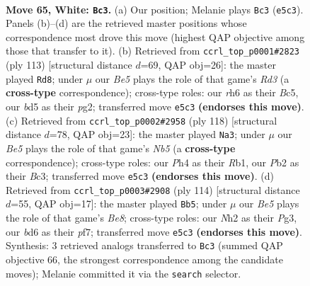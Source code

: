 \documentclass[11pt]{article}
\begin{document}
\clearpage

\begin{figure}[p]\centering
\begin{subfigure}{0.46\textwidth}\centering
\resizebox{\linewidth}{!}{%
\newchessgame
\chessboard[
  setfen={4r3/5kp1/p2b3r/PppbBp1p/2p2P1P/4P1P1/1P2K2N/1R4R1 w - - 2 65},
  showmover=false,
  pgfstyle=straightmove, color=movearrow, markmove={e5-c3}
]}
\caption{}
\end{subfigure}\hfill
\begin{subfigure}{0.46\textwidth}\centering
\resizebox{\linewidth}{!}{%
\newchessgame
\chessboard[
  setfen={8/2p2pk1/1p1r1p1p/pPbBp3/P3P2P/2P2R2/4KPP1/8 b - - 4 57},
  showmover=false,
  pgfstyle=straightmove, color=movearrow, markmove={d6-d8}
]}
\caption{}
\end{subfigure}
\\[4pt]
\begin{subfigure}{0.46\textwidth}\centering
\resizebox{\linewidth}{!}{%
\newchessgame
\chessboard[
  setfen={1r2n3/4b3/1r2kp2/1Np1p1p1/p1K1P2p/2B2P1P/PP1R2P1/1R6 w - - 13 60},
  showmover=false,
  pgfstyle=straightmove, color=movearrow, markmove={b5-a3}
]}
\caption{}
\end{subfigure}\hfill
\begin{subfigure}{0.46\textwidth}\centering
\resizebox{\linewidth}{!}{%
\newchessgame
\chessboard[
  setfen={r3B3/5p2/1p1r4/3p1k1p/P1pPp1bP/4P1P1/PR3P1K/1R6 w - - 27 58},
  showmover=false,
  pgfstyle=straightmove, color=movearrow, markmove={e8-b5}
]}
\caption{}
\end{subfigure}
\caption{\textbf{Move 65, White: \texttt{Bc3}.} (a) Our position; Melanie plays \texttt{Bc3} (\texttt{e5c3}). Panels (b)--(d) are the retrieved master positions whose correspondence most drove this move (highest QAP objective among those that transfer to it). (b) Retrieved from \texttt{ccrl\_top\_p0001\#2823} (ply 113) [structural distance $d$=69, QAP obj=26]: the master played \texttt{Rd8}; under $\mu$ our \emph{Be5} plays the role of that game's \emph{Rd3} (a \textbf{cross-type} correspondence); cross-type roles: our \emph{r}h6 as their \emph{B}c5, our \emph{b}d5 as their \emph{p}g2; transferred move \texttt{e5c3} \textbf{(endorses this move)}. (c) Retrieved from \texttt{ccrl\_top\_p0002\#2958} (ply 118) [structural distance $d$=78, QAP obj=23]: the master played \texttt{Na3}; under $\mu$ our \emph{Be5} plays the role of that game's \emph{Nb5} (a \textbf{cross-type} correspondence); cross-type roles: our \emph{P}h4 as their \emph{R}b1, our \emph{P}b2 as their \emph{B}c3; transferred move \texttt{e5c3} \textbf{(endorses this move)}. (d) Retrieved from \texttt{ccrl\_top\_p0003\#2908} (ply 114) [structural distance $d$=55, QAP obj=17]: the master played \texttt{Bb5}; under $\mu$ our \emph{Be5} plays the role of that game's \emph{Be8}; cross-type roles: our \emph{N}h2 as their \emph{P}g3, our \emph{b}d6 as their \emph{p}f7; transferred move \texttt{e5c3} \textbf{(endorses this move)}. Synthesis: 3 retrieved analogs transferred to \texttt{Bc3} (summed QAP objective 66, the strongest correspondence among the candidate moves); Melanie committed it via the \texttt{search} selector.}
\label{fig:thought-m128}
\end{figure}
\end{document}
